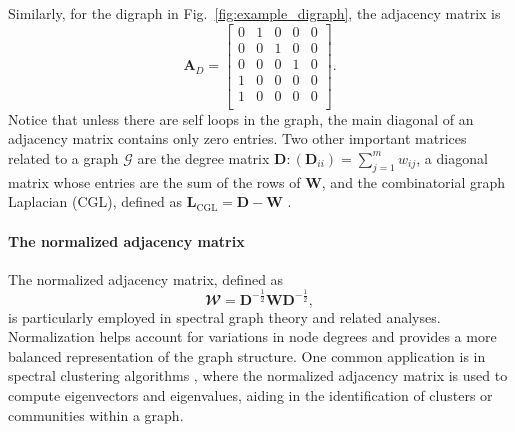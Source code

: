 Similarly, for the digraph in Fig.~\ref{fig:example_digraph}, the adjacency matrix is
\begin{equation*}
	\bm{A}_D = \begin{bmatrix}
		0 & 1 & 0 & 0 & 0\\
		0 & 0 & 1 & 0 & 0\\
		0 & 0 & 0 & 1 & 0\\
		1 & 0 & 0 & 0 & 0\\
		1 & 0 & 0 & 0 & 0\\
	\end{bmatrix}.
\end{equation*} 
Notice that unless there are self loops in the graph, the main diagonal of an adjacency matrix contains only zero entries. Two other important matrices related to a graph $ \mathcal{G} $ are the degree matrix $ \bm{D}: (\bm{D}_{ii})=\sum_{j=1}^{m} w_{ij} $, a diagonal matrix whose entries are the sum of the rows of $ \bm{W} $, and the combinatorial graph Laplacian (CGL), defined as $ \bm{L}_\text{CGL} = \bm{D} - \bm{W} $ \cite{Mateos2019ConnectingdotsIdentifying}.

\paragraph*{The normalized adjacency matrix} 
The normalized adjacency matrix, defined as
\begin{equation}
	\mathbfcal{W} = \bm{D}^{-\frac{1}{2}} \bm{W} \bm{D}^{-\frac{1}{2}},
\end{equation}
is particularly employed in spectral graph theory \cite{Spielman2012Spectralgraphtheory} and related analyses. Normalization helps account for variations in node degrees and provides a more balanced representation of the graph structure. One common application is in spectral clustering algorithms \cite{VonLuxburg2007tutorialspectralclusteringa}, where the normalized adjacency matrix is used to compute eigenvectors and eigenvalues, aiding in the identification of clusters or communities within a graph. %

